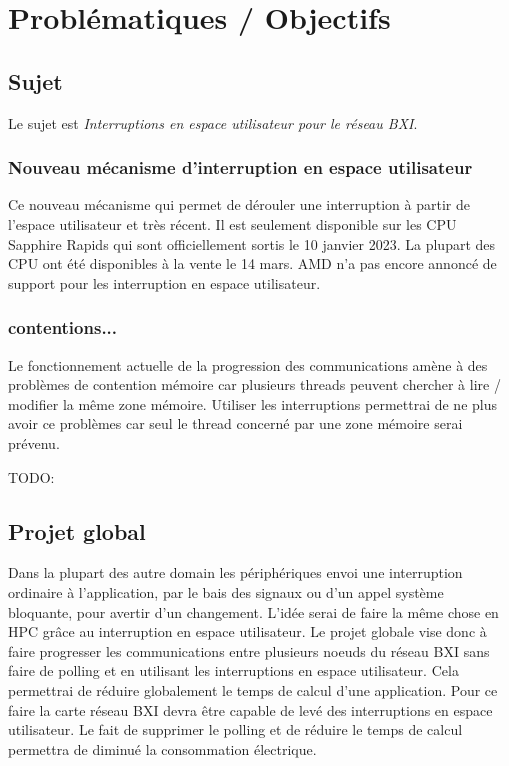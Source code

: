 \section{Problématiques / Objectifs} %

\subsection{Sujet}

Le sujet est \emph{Interruptions en espace utilisateur pour le réseau BXI}.

\subsubsection{Nouveau mécanisme d'interruption en espace utilisateur}

Ce nouveau mécanisme qui permet de dérouler une interruption à partir de l'espace utilisateur et très récent.
Il est seulement disponible sur les CPU \intel{} Sapphire Rapids qui sont officiellement sortis le 10 janvier 2023.
La plupart des CPU ont été disponibles à la vente le 14 mars.
AMD n'a pas encore annoncé de support pour les interruption en espace utilisateur.

\subsubsection{contentions...} %

Le fonctionnement actuelle de la progression des communications amène à des problèmes de contention mémoire car plusieurs threads peuvent chercher à lire / modifier la même zone mémoire.
Utiliser les interruptions permettrai de ne plus avoir ce problèmes car seul le thread concerné par une zone mémoire serai prévenu.

TODO: 

\subsection{Projet global}

Dans la plupart des autre domain les périphériques envoi une interruption ordinaire à l'application, par le bais des signaux ou d'un appel système bloquante, pour avertir d'un changement.
L'idée serai de faire la même chose en HPC grâce au interruption en espace utilisateur.
Le projet globale vise donc à faire progresser les communications entre plusieurs noeuds du réseau BXI sans faire de polling et en utilisant les interruptions en espace utilisateur.
Cela permettrai de réduire globalement le temps de calcul d'une application.
Pour ce faire la carte réseau BXI devra être capable de levé des interruptions en espace utilisateur.
Le fait de supprimer le polling et de réduire le temps de calcul permettra de diminué la consommation électrique.

